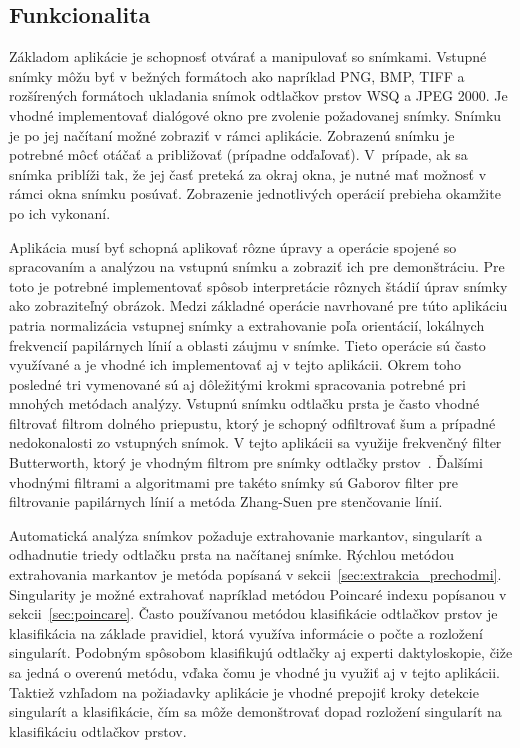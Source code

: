   \subsection{Funkcionalita}
  Základom aplikácie je schopnosť otvárať a manipulovať so snímkami. Vstupné snímky môžu byť v bežných formátoch ako napríklad PNG, BMP, TIFF a rozšírených
  formátoch ukladania snímok odtlačkov prstov WSQ a JPEG 2000. Je vhodné implementovať dialógové okno pre zvolenie požadovanej snímky.
  Snímku je po jej načítaní možné zobraziť v rámci aplikácie. Zobrazenú snímku je potrebné môcť otáčať a približovať (prípadne odďaľovať). V~prípade, ak
  sa snímka priblíži tak, že jej časť preteká za okraj okna, je nutné mať možnosť v rámci okna snímku posúvať. Zobrazenie jednotlivých operácií prebieha
  okamžite po ich vykonaní.

  Aplikácia musí byť schopná aplikovať rôzne úpravy a operácie spojené so spracovaním a analýzou na vstupnú snímku a zobraziť ich pre demonštráciu.
  Pre toto je potrebné implementovať spôsob interpretácie rôznych štádií úprav snímky ako zobraziteľný obrázok. Medzi základné operácie navrhované pre túto
  aplikáciu patria normalizácia vstupnej snímky a extrahovanie poľa orientácií, lokálnych frekvencií papilárnych línií a oblasti záujmu v snímke. Tieto
  operácie sú často využívané a je vhodné ich implementovať aj v tejto aplikácii. Okrem toho posledné tri vymenované sú aj dôležitými krokmi spracovania
  potrebné pri mnohých metódach analýzy. Vstupnú snímku odtlačku prsta je často vhodné filtrovať filtrom dolného priepustu, ktorý je schopný odfiltrovať šum
  a prípadné nedokonalosti zo vstupných snímok. V tejto aplikácii sa využije frekvenčný filter Butterworth, ktorý je vhodným filtrom pre snímky odtlačky
  prstov~{\cite{Drahansky}}. Ďalšími vhodnými filtrami a algoritmami pre takéto snímky sú Gaborov filter pre filtrovanie papilárnych línií a
  metóda Zhang-Suen pre stenčovanie línií.

  Automatická analýza snímkov požaduje extrahovanie markantov, singularít a odhadnutie triedy odtlačku prsta na načítanej snímke. Rýchlou metódou extrahovania
  markantov je metóda popísaná v sekcii~{\ref{sec:extrakcia_prechodmi}}. Singularity je možné extrahovať napríklad metódou Poincaré indexu popísanou v
  sekcii~{\ref{sec:poincare}}. Často používanou metódou klasifikácie odtlačkov prstov je klasifikácia na základe pravidiel, ktorá využíva informácie o
  počte a rozložení singularít.
  Podobným spôsobom klasifikujú odtlačky aj experti daktyloskopie, čiže sa jedná o overenú metódu, vďaka čomu je vhodné ju využiť aj v tejto aplikácii.
  Taktiež vzhľadom na požiadavky aplikácie je vhodné prepojiť kroky detekcie singularít a klasifikácie, čím sa môže demonštrovať
  dopad rozložení singularít na klasifikáciu odtlačkov prstov.

